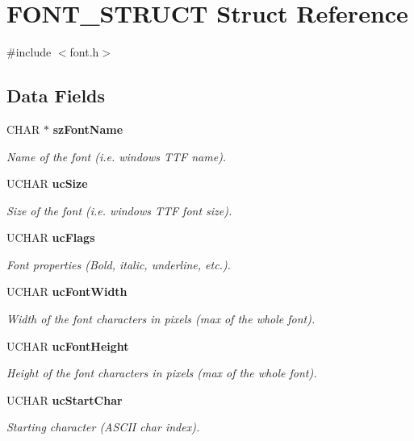 \section{FONT\_\-STRUCT Struct Reference}
\label{struct_f_o_n_t___s_t_r_u_c_t}


{\ttfamily \#include $<$font.h$>$}\subsection*{Data Fields}
\begin{DoxyCompactItemize}
\item 
CHAR $\ast$ {\bf szFontName}
\begin{DoxyCompactList}\small\item\em Name of the font (i.e. windows TTF name). \item\end{DoxyCompactList}\item 
UCHAR {\bf ucSize}
\begin{DoxyCompactList}\small\item\em Size of the font (i.e. windows TTF font size). \item\end{DoxyCompactList}\item 
UCHAR {\bf ucFlags}
\begin{DoxyCompactList}\small\item\em Font properties (Bold, italic, underline, etc.). \item\end{DoxyCompactList}\item 
UCHAR {\bf ucFontWidth}
\begin{DoxyCompactList}\small\item\em Width of the font characters in pixels (max of the whole font). \item\end{DoxyCompactList}\item 
UCHAR {\bf ucFontHeight}
\begin{DoxyCompactList}\small\item\em Height of the font characters in pixels (max of the whole font). \item\end{DoxyCompactList}\item 
UCHAR {\bf ucStartChar}
\begin{DoxyCompactList}\small\item\em Starting character (ASCII char index). \item\end{DoxyCompactList}\item 

\end{DoxyCompactItemize}

